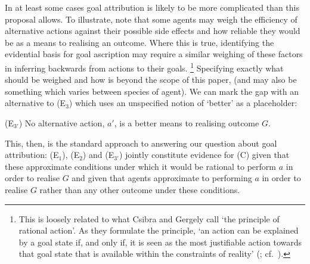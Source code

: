 \documentclass[12pt,a4paper]{extarticle}
\begin{document}
In at least some cases goal attribution is likely to be more complicated than this proposal allows.
To illustrate, note that some agents may weigh the efficiency of alternative actions against their possible side effects and how reliable they would be as a means to realising an outcome.
Where this is true, 
identifying the evidential basis for goal ascription may require  a similar weighing of these factors in inferring backwards from actions to their goals.%
\footnote{
This is loosely related to what Csibra and Gergely call `the principle of rational action'.
As they formulate the principle,
`an action can be explained by a goal state if, and only if, it is seen as the most justifiable action towards that goal state that is available within the constraints of reality'
(\citealp[p.\ *]{Csibra:1998cx}; cf.\ \citealp{Csibra:2003jv}).
}
Specifying exactly what should be weighed and how is beyond the scope of this paper,
(and may also be something which varies between species of agent).
We can mark the gap with an alternative to (E$_3$) which uses an unspecified notion of `better' as a placeholder:
%
\begin{idescription}
\item[(E$_{3'}$)] No alternative action, $a'$, is a better means to realising outcome $G$.
\end{idescription}
%
This, then, is the standard approach to answering our question about goal attribution: (E$_1$), (E$_2$) and (E$_{3'}$) jointly constitute evidence for (C) given that these approximate conditions under which it would be rational to perform $a$ in order to realise $G$ and given that agents approximate to performing $a$ in order to realise $G$ rather than any other outcome under these conditions.










\end{document}
